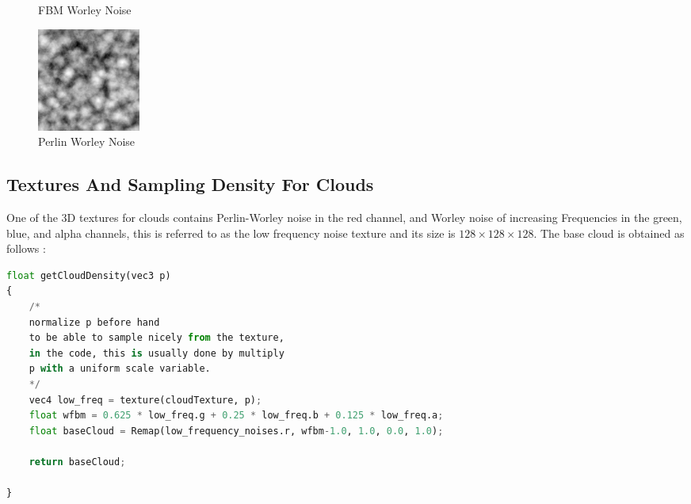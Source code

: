 \begin{figure}[H]
\begin{minipage}[t]{0.32\textwidth}
        \caption{FBM Worley Noise}
        \label{fig:fbm_worley}
    \end{minipage}
    \hfill
    \begin{minipage}[t]{0.32\textwidth}
        \centering
        \includegraphics[width=\linewidth]{images/perlin_worley.png}
        \caption{Perlin Worley Noise}
        \label{fig:perlin_worley}
    \end{minipage}
\end{figure}

\subsection{Textures And Sampling Density For Clouds}
One of the 3D textures for clouds contains Perlin-Worley noise in the red channel, and Worley noise of increasing Frequencies in the green, blue, and alpha channels, this is referred to as the low frequency noise texture and its size is $128\times128\times128$. The base cloud is obtained as follows \cite{engel2016gpupro7}:

\begin{lstlisting}[language=Python]
float getCloudDensity(vec3 p)
{
    /*
    normalize p before hand 
    to be able to sample nicely from the texture,
    in the code, this is usually done by multiply 
    p with a uniform scale variable.
    */
    vec4 low_freq = texture(cloudTexture, p);
    float wfbm = 0.625 * low_freq.g + 0.25 * low_freq.b + 0.125 * low_freq.a;
    float baseCloud = Remap(low_frequency_noises.r, wfbm-1.0, 1.0, 0.0, 1.0);

    return baseCloud;

}
\end{lstlisting}

